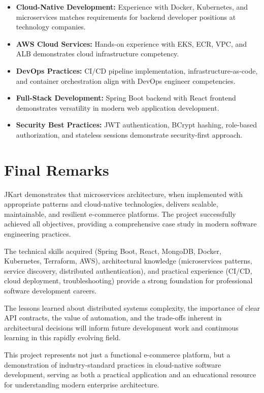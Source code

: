 \begin{itemize}
    \item \textbf{Cloud-Native Development:} Experience with Docker, Kubernetes, and microservices matches requirements for backend developer positions at technology companies.
    
    \item \textbf{AWS Cloud Services:} Hands-on experience with EKS, ECR, VPC, and ALB demonstrates cloud infrastructure competency.
    
    \item \textbf{DevOps Practices:} CI/CD pipeline implementation, infrastructure-as-code, and container orchestration align with DevOps engineer competencies.
    
    \item \textbf{Full-Stack Development:} Spring Boot backend with React frontend demonstrates versatility in modern web application development.
    
    \item \textbf{Security Best Practices:} JWT authentication, BCrypt hashing, role-based authorization, and stateless sessions demonstrate security-first approach.
\end{itemize}

\section{Final Remarks}

JKart demonstrates that microservices architecture, when implemented with appropriate patterns and cloud-native technologies, delivers scalable, maintainable, and resilient e-commerce platforms. The project successfully achieved all objectives, providing a comprehensive case study in modern software engineering practices.

The technical skills acquired (Spring Boot, React, MongoDB, Docker, Kubernetes, Terraform, AWS), architectural knowledge (microservices patterns, service discovery, distributed authentication), and practical experience (CI/CD, cloud deployment, troubleshooting) provide a strong foundation for professional software development careers.

The lessons learned about distributed systems complexity, the importance of clear API contracts, the value of automation, and the trade-offs inherent in architectural decisions will inform future development work and continuous learning in this rapidly evolving field.

This project represents not just a functional e-commerce platform, but a demonstration of industry-standard practices in cloud-native software development, serving as both a practical application and an educational resource for understanding modern enterprise architecture.

